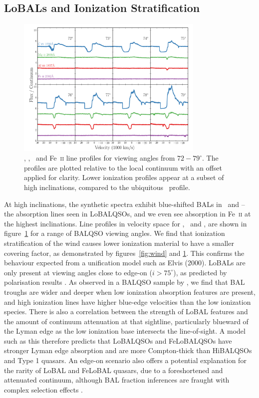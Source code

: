\documentclass[useAMS,usenatbib]{mn2e_x}
\begin{document}
\subsection{LoBALs and Ionization Stratification}

\begin{figure}
\centering
\includegraphics[width=0.8\textwidth]{figures/c4_angles.png}
\caption
{
\civ , \mg , \al\ and Fe~\textsc{ii} line profiles for viewing angles
from $72-79^\circ$. The profiles are plotted relative to the local
continuum with an offset applied for clarity. Lower ionization
profiles appear at a subset of high inclinations, compared
to the ubiquitous \civ\ profile.
}
\label{fig:lobal}
\end{figure}


At high inclinations, the synthetic spectra exhibit blue-shifted BALs in \al\ and \mg --
the absorption lines seen in LoBALQSOs, and we even see absorption in Fe~\textsc{ii}
at the highest inclinations. Line profiles in velocity space 
for \civ, \al\ and \mg, are shown in figure~\ref{fig:lobal} for a range
of BALQSO viewing angles. We find that ionization stratification
of the wind causes lower ionization material to have a smaller covering factor, 
as demonstrated by figures~\ref{fig:wind} and \ref{fig:lobal}.
This confirms the behaviour expected from a unification model such as Elvis (2000). 
LoBALs are only present at viewing angles close to edge-on ($i>75^\circ$),
as predicted by polarisation results \citep{brotherton1997}.
As observed in a BALQSO sample by \cite{filizak2014}, we find that
BAL troughs are wider and deeper when low ionization absorption features are present,
and high ionization lines have higher blue-edge velocities than the 
low ionization species.
There is also a correlation between the strength of LoBAL features
and the amount of continuum attenuation at that sightline, particularly
blueward of the Lyman edge as the low ionization base 
intersects the line-of-sight. 
A model such as this therefore predicts that LoBALQSOs and FeLoBALQSOs 
have stronger Lyman edge absorption and 
are more Compton-thick than HiBALQSOs and Type 1 quasars.
An edge-on scenario also offers a potential explanation for the rarity of LoBAL and
FeLoBAL quasars, due to a foreshortened and attenuated continuum, 
although BAL fraction inferences are fraught with complex selection 
effects \citep{goodrich1997,krolikvoit1998}.
\end{document}
